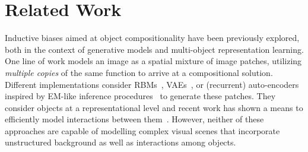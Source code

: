 \documentclass{article}
\begin{document}
\section{Related Work}
Inductive biases aimed at object compositionality have been previously explored, both in the context of generative models and multi-object representation learning.
One line of work models an image as a spatial mixture of image patches, utilizing \emph{multiple copies} of the same function to arrive at a compositional solution.
Different implementations consider RBMs~\citep{le2011learning}, VAEs~\citep{nash17}, or (recurrent) auto-encoders inspired by EM-like inference procedures~\citep{greff2016tagger, greff2017neural} to generate these patches.
They consider objects at a representational level and recent work has shown a means to efficiently model interactions between them~\citep{steenkiste2018relational}.
However, neither of these approaches are capable of modelling complex visual scenes that incorporate unstructured background as well as interactions among objects.
\end{document}
